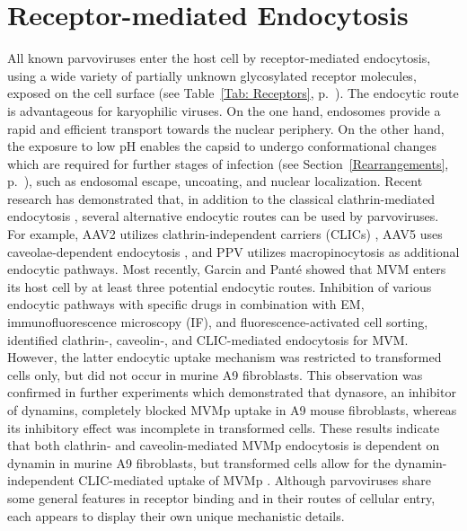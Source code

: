\section{Receptor-mediated Endocytosis}
\label{Endocytosis}
All known parvoviruses enter the host cell by receptor-mediated endocytosis, using a wide variety of partially unknown glycosylated receptor molecules, exposed on the cell surface \cite{pmid18406140} (see Table~\ref{Tab: Receptors}, p.~\pageref{Tab: Receptors}). The endocytic route is advantageous for karyophilic viruses. On the one hand, endosomes provide a rapid and efficient transport towards the nuclear periphery. On the other hand, the exposure to low pH enables the capsid to undergo conformational changes which are required for further stages of infection (see Section~\ref{Rearrangements}, p.~\pageref{Rearrangements}), such as endosomal escape, uncoating, and nuclear localization. Recent research has demonstrated that, in addition to the classical clathrin-mediated endocytosis \cite{pmid20484503, pmid10559355, pmid10644365}, several alternative endocytic routes can be used by parvoviruses. For example, AAV2 utilizes clathrin-independent carriers (CLICs) \cite{pmid22177561}, AAV5 uses caveolae-dependent endocytosis \cite{pmid19141440}, and PPV utilizes macropinocytosis \cite{pmid20484503} as additional endocytic pathways. Most recently, Garcin and Panté showed that MVM enters its host cell by at least three potential endocytic routes. Inhibition of various endocytic pathways with specific drugs in combination with EM, immunofluorescence microscopy (IF), and fluorescence-activated cell sorting, identified clathrin-, caveolin-, and CLIC-mediated endocytosis for MVM. However, the latter endocytic uptake mechanism was restricted to transformed cells only, but did not occur in murine A9 fibroblasts. This observation was confirmed in further experiments which demonstrated that dynasore, an inhibitor of dynamins, completely blocked MVMp uptake in A9 mouse fibroblasts, whereas its inhibitory effect was incomplete in transformed cells. These results indicate that both clathrin- and caveolin-mediated MVMp endocytosis is dependent on dynamin in murine A9 fibroblasts, but transformed cells allow for the dynamin-independent CLIC-mediated uptake of MVMp \cite{pmid25863880}. Although parvoviruses share some general features in receptor binding and in their routes of cellular entry, each appears to display their own unique mechanistic details.     

